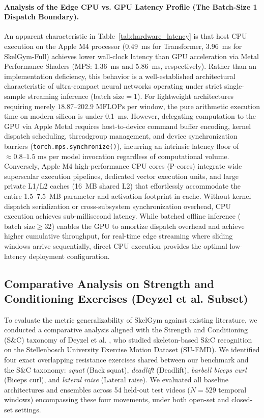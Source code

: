 \documentclass[runningheads]{llncs}
\begin{document}
\paragraph{Analysis of the Edge CPU vs. GPU Latency Profile (The Batch-Size 1 Dispatch Boundary).}
An apparent characteristic in Table~\ref{tab:hardware_latency} is that host CPU execution on the Apple M4 processor (0.49~ms for Transformer, 3.96~ms for SkelGym-Full) achieves lower wall-clock latency than GPU acceleration via Metal Performance Shaders (MPS: 1.36~ms and 5.86~ms, respectively). Rather than an implementation deficiency, this behavior is a well-established architectural characteristic of ultra-compact neural networks operating under strict single-sample streaming inference ($\text{batch size} = 1$). For lightweight architectures requiring merely $18.87\text{--}202.9\text{ MFLOPs}$ per window, the pure arithmetic execution time on modern silicon is under 0.1~ms. However, delegating computation to the GPU via Apple Metal requires host-to-device command buffer encoding, kernel dispatch scheduling, threadgroup management, and device synchronization barriers (\texttt{torch.mps.synchronize()}), incurring an intrinsic latency floor of $\approx 0.8\text{--}1.5\text{ ms}$ per model invocation regardless of computational volume. Conversely, Apple M4 high-performance CPU cores (P-cores) integrate wide superscalar execution pipelines, dedicated vector execution units, and large private L1/L2 caches (16~MB shared L2) that effortlessly accommodate the entire 1.5--7.5~MB parameter and activation footprint in cache. Without kernel dispatch serialization or cross-subsystem synchronization overhead, CPU execution achieves sub-millisecond latency. While batched offline inference ($\text{batch size} \ge 32$) enables the GPU to amortize dispatch overhead and achieve higher cumulative throughput, for real-time edge streaming where sliding windows arrive sequentially, direct CPU execution provides the optimal low-latency deployment configuration.

\subsection{Comparative Analysis on Strength and Conditioning Exercises (Deyzel et al. Subset)}
\label{sec:external_benchmark}
To evaluate the metric generalizability of SkelGym against existing literature, we conducted a comparative analysis aligned with the Strength and Conditioning (S\&C) taxonomy of Deyzel et al. \cite{deyzel2023}, who studied skeleton-based S\&C recognition on the Stellenbosch University Exercise Motion Dataset (SU-EMD). We identified four exact overlapping resistance exercises shared between our benchmark and the S\&C taxonomy: \textit{squat} (Back squat), \textit{deadlift} (Deadlift), \textit{barbell biceps curl} (Biceps curl), and \textit{lateral raise} (Lateral raise). We evaluated all baseline architectures and ensembles across 54 held-out test videos ($N=529$ temporal windows) encompassing these four movements, under both open-set and closed-set settings.
\end{document}
